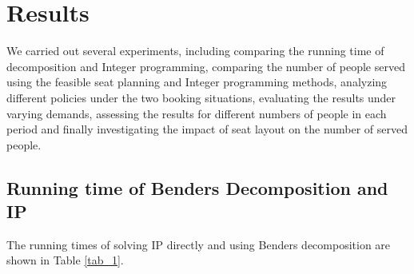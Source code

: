 
\section{Results}

We carried out several experiments, including comparing the running time of decomposition and Integer programming, comparing the number of people served using the feasible seat planning and Integer programming methods, analyzing different policies under the two booking situations, evaluating the results under varying demands, assessing the results for different numbers of people in each period and finally investigating the impact of seat layout on the number of served people.




\subsection{Running time of Benders Decomposition and IP}\label{Bender_IP}



The running times of solving IP directly and using Benders decomposition are shown in Table \ref{tab_1}. 

